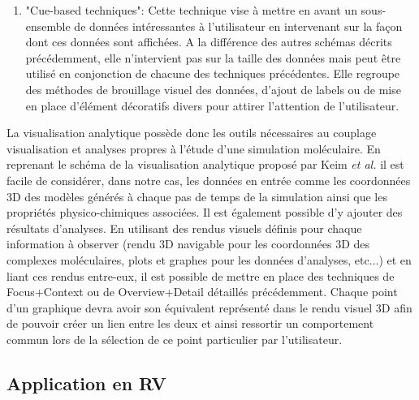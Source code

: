 \begin{enumerate}
    \item "Cue-based techniques": Cette technique vise à mettre en avant un sous-ensemble de données intéressantes à l'utilisateur en intervenant sur la façon dont ces données sont affichées. A la différence des autres schémas décrits précédemment, elle n'intervient pas sur la taille des données mais peut être utilisé en conjonction de chacune des techniques précédentes. Elle regroupe des méthodes de brouillage visuel des données, d'ajout de labels ou de mise en place d'élément décoratifs divers pour attirer l'attention de l'utilisateur.
\end{enumerate}

La visualisation analytique possède donc les outils nécessaires au couplage visualisation et analyses propres à l'étude d'une simulation moléculaire. En reprenant le schéma de la visualisation analytique proposé par Keim \textit{et al.} il est facile de considérer, dans notre cas, les données en entrée comme les coordonnées 3D des modèles générés à chaque pas de temps de la simulation ainsi que les propriétés physico-chimiques associées. Il est également possible d'y ajouter des résultats d'analyses. En utilisant des rendus visuels définis pour chaque information à observer (rendu 3D navigable pour les coordonnées 3D des complexes moléculaires, plots et graphes pour les données d'analyses, etc...) et en liant ces rendus entre-eux, il est possible de mettre en place des techniques de Focus+Context ou de Overview+Detail détaillés précédemment. Chaque point d'un graphique devra avoir son équivalent représenté dans le rendu visuel 3D afin de pouvoir créer un lien entre les deux et ainsi ressortir un comportement commun lors de la sélection de ce point particulier par l'utilisateur.

\subsection{Application en RV}

